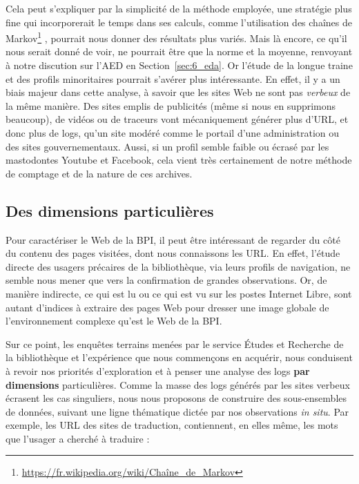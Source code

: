\documentclass[symmetric,justified,marginals=raggedouter]{tufte-book}
\begin{document}
Cela peut s'expliquer par la simplicité de la méthode employée, une stratégie plus fine qui incorporerait le temps dans ses calculs, comme l'utilisation des chaînes de Markov\footnote{\RaggedOuter \url{https://fr.wikipedia.org/wiki/Chaîne\_de\_Markov}} \citep{cadez_model-based_2003}, pourrait nous donner des résultats plus variés. Mais là encore, ce qu'il nous serait donné de voir, ne pourrait être que la norme et la moyenne, renvoyant à notre discution sur l'AED en Section~\ref{sec:6_eda}. Or l'étude de la longue traine et des profils minoritaires pourrait s'avérer plus intéressante. En effet, il y a un biais majeur dans cette analyse, à savoir que les sites Web ne sont pas \textit{verbeux} de la même manière. Des sites emplis de publicités (même si nous en supprimons beaucoup), de vidéos ou de traceurs vont mécaniquement générer plus d'URL, et donc plus de logs, qu'un site modéré comme le portail d'une administration ou des sites gouvernementaux. Aussi, si un profil semble faible ou écrasé par les mastodontes Youtube et Facebook, cela vient très certainement de notre méthode de comptage et de la nature de ces archives.

\subsection{Des dimensions particulières}

\noindent Pour caractériser le Web de la BPI, il peut être intéressant de regarder du côté du contenu des pages visitées, dont nous connaissons les URL. En effet, l'étude directe des usagers précaires de la bibliothèque, via leurs profils de navigation, ne semble nous mener que vers la confirmation de grandes observations. Or, de manière indirecte, ce qui est lu ou ce qui est vu sur les postes Internet Libre, sont autant d'indices à extraire des pages Web pour dresser une image globale de l'environnement complexe qu'est le Web de la BPI.

Sur ce point, les enquêtes terrains menées par le service Études et Recherche de la bibliothèque et l'expérience que nous commençons en acquérir, nous conduisent à revoir nos priorités d'exploration et à penser une analyse des logs \textbf{par dimensions} particulières. Comme la masse des logs générés par les sites verbeux écrasent les cas singuliers, nous nous proposons de construire des sous-ensembles de données, suivant une ligne thématique dictée par nos observations \textit{in situ}. Par exemple, les URL des sites de traduction, contiennent, en elles même, les mots que l'usager a cherché à traduire :
\end{document}
